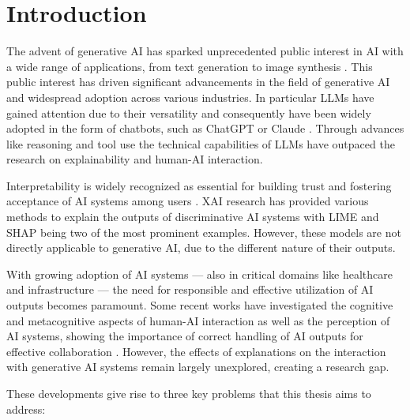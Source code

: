 \section{Introduction} \label{sec:introduction}

The advent of generative \ac{AI} has sparked unprecedented public interest in \ac{AI} with a wide range of applications, from text generation \parencite{OpenAI2022} to image synthesis \parencite{Rombach2021}. This public interest has driven significant advancements in the field of generative \ac{AI} and widespread adoption across various industries. In particular \acp{LLM} have gained attention due to their versatility and consequently have been widely adopted in the form of chatbots, such as ChatGPT \parencite{OpenAI2025} or Claude \parencite{AnthropicInc2025}. Through advances like reasoning \parencite{OpenAI2024a} and tool use \parencite{AnthropicInc2024} the technical capabilities of \acp{LLM} have outpaced the research on explainability and human-\ac{AI} interaction.

Interpretability is widely recognized as essential for building trust and fostering acceptance of \ac{AI} systems among users \parencite{Arrieta2020,Shin2021}. \ac{XAI} research has provided various methods to explain the outputs of discriminative \ac{AI} systems with LIME \parencite{Ribeiro2016} and SHAP \parencite{Lundberg2017} being two of the most prominent examples. However, these models are not directly applicable to generative \ac{AI}, due to the different nature of their outputs.

With growing adoption of \ac{AI} systems — also in critical domains like healthcare and infrastructure — the need for responsible and effective utilization of \ac{AI} outputs becomes paramount. Some recent works have investigated the cognitive and metacognitive aspects of human-\ac{AI} interaction as well as the perception of \ac{AI} systems, showing the importance of correct handling of \ac{AI} outputs for effective collaboration \parencite{Jussupow2021,Kazemitabaar2024}. However, the effects of explanations on the interaction with generative \ac{AI} systems remain largely unexplored, creating a research gap.

These developments give rise to three key problems that this thesis aims to address:

